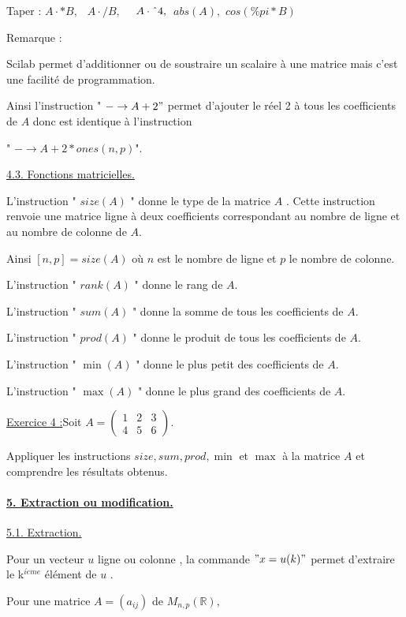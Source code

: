 \documentclass{article}
\begin{document}
Taper : $A\cdot \ast B,$ $\ \ A\cdot /B,$ $\ \ \ A\cdot \symbol{94}4,$ $\
abs(A),$ $cos(\%pi\ast B)$

Remarque :

Scilab permet d'additionner ou de soustraire un scalaire \`{a} une matrice
mais c'est une facilit\'{e} de programmation.

Ainsi l'instruction " $-\rightarrow A+2"$ permet d'ajouter le r\'{e}el 2 
\`{a} tous les coefficients de $A$ donc est identique \`{a} l'instruction

" $-\rightarrow A+2\ast ones(n,p)$".

\underline{4.3. Fonctions matricielles.}

L'instruction " $size(A)$ " donne le type de la matrice $A$ . Cette
instruction renvoie une matrice ligne \`{a} deux coefficients correspondant
au nombre de ligne et au nombre de colonne de $A.$

Ainsi $\left[ n,p\right] =size(A)$ o\`{u} $n$ est le nombre de ligne et $p$
le nombre de colonne.

L'instruction " $rank(A)$ " donne le rang de $A.$

L'instruction " $sum(A)$ " donne la somme de tous les coefficients de $A.$

L'instruction " $prod(A)$ " donne le produit de tous les coefficients de $A.$

L'instruction " $\min (A)$ " donne le plus petit des coefficients de $A.$

L'instruction " $\max (A)$ " donne le plus grand des coefficients de $A.$

\underline{Exercice 4 :}Soit $A=\left( 
\begin{array}{ccc}
1 & 2 & 3 \\ 
4 & 5 & 6%
\end{array}%
\right) .$

Appliquer les instructions $size,sum,prod,\min $ et $\max $ \`{a} la matrice 
$A$ et comprendre les r\'{e}sultats obtenus.

\paragraph{\protect\underline{5. Extraction ou modification.}}

\underline{5.1. Extraction.}

Pour un vecteur $u$ ligne ou colonne , la commande $"x=u(k)"$ permet
d'extraire le k$^{i\grave{e}me}$ \'{e}l\'{e}ment de $u$ .

Pour une matrice $A=(a_{ij})$ de $M_{n,p}(%
\mathbb{R}
),$
\end{document}
